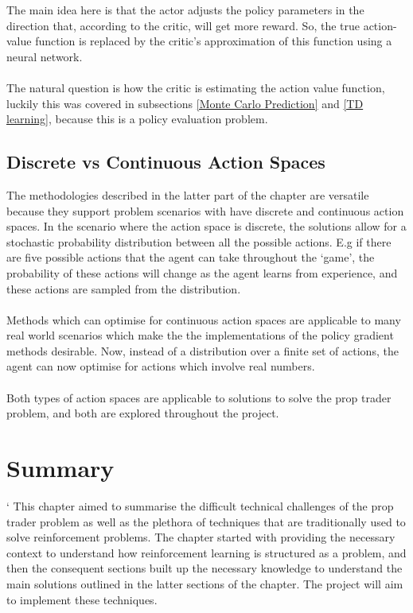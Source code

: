\documentclass[ %
                    author={Ashwinder Khurana},
                supervisor={Prof Dave Cliff},
                    degree={MEng},
                     title={The Deeply Reinforced Trader},
                  subtitle={},
                      type={enterprise},
                      year={2020} ]{dissertation}
\begin{document}
{\noindent
The main idea here is that the actor adjusts the policy parameters in the direction that, according to the critic, will get more reward. So, the true action-value function is replaced by the critic's approximation of this function using a neural network. 
\\
\\
\noindent
The natural question is how the critic is estimating the action value function, luckily this was covered in subsections \ref{Monte Carlo Prediction} and \ref{TD learning}, because this is a policy evaluation problem. 

%
\subsection{Discrete vs Continuous Action Spaces}
\label{subsection:Discrete Vs Continuous Action Spaces}
The methodologies described in the latter part of the chapter are versatile because they support problem scenarios with have discrete and continuous action spaces. In the scenario where the action space is discrete, the solutions allow for a stochastic probability distribution between all the possible actions. E.g if there are five possible actions that the agent can take throughout the \enquote*{game}, the probability of these actions will change as the agent learns from experience, and these actions are sampled from the distribution. 
\\
\\
Methods which can optimise for continuous action spaces are applicable to many real world scenarios which make the the implementations of the policy gradient methods desirable. Now, instead of a distribution over a finite set of actions, the agent can now optimise for actions which involve real numbers.
\\
\\
\noindent
Both types of action spaces are applicable to solutions to solve the prop trader problem, and both are explored throughout the project.

\section{Summary}`
\noindent
This chapter aimed to summarise the difficult technical challenges of the prop trader problem as well as the plethora of techniques that are traditionally used to solve reinforcement problems. The chapter started with providing the necessary context to understand how reinforcement learning is structured as a problem, and then the consequent sections built up the necessary knowledge to understand the main solutions outlined in the latter sections of the chapter. The project will aim to implement these techniques. 

}
\end{document}
